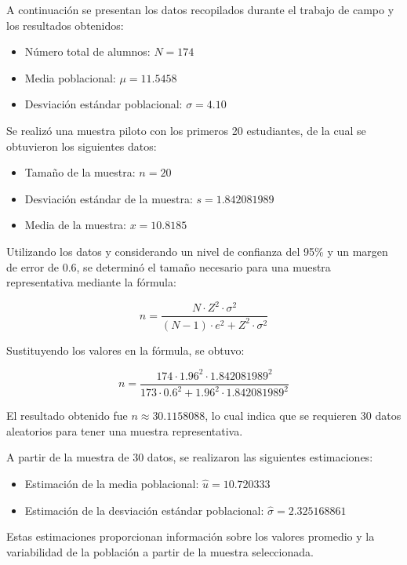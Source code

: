 \documentclass[
  a4paper,
]{article}
\providecommand{\tightlist}{%
  \setlength{\itemsep}{0pt}\setlength{\parskip}{0pt}}\usepackage{longtable,booktabs,array}
\begin{document}
A continuación se presentan los datos recopilados durante el trabajo de
campo y los resultados obtenidos:

\begin{itemize}
\tightlist
\item
  Número total de alumnos: \(N = 174\)
\item
  Media poblacional: \(\mu = 11.5458\)
\item
  Desviación estándar poblacional: \(\sigma = 4.10\)
\end{itemize}

Se realizó una muestra piloto con los primeros 20 estudiantes, de la
cual se obtuvieron los siguientes datos:

\begin{itemize}
\tightlist
\item
  Tamaño de la muestra: \(n = 20\)
\item
  Desviación estándar de la muestra: \(s = 1.842081989\)
\item
  Media de la muestra: \(x = 10.8185\)
\end{itemize}

Utilizando los datos y considerando un nivel de confianza del 95\% y un
margen de error de 0.6, se determinó el tamaño necesario para una
muestra representativa mediante la fórmula:

\[
n = \frac{{N \cdot Z^2 \cdot \sigma^2}}{{(N-1) \cdot e^2 + Z^2 \cdot \sigma^2}}
\]

Sustituyendo los valores en la fórmula, se obtuvo:

\[
n = \frac{{174 \cdot 1.96^2 \cdot 1.842081989^2}}{{173 \cdot 0.6^2 + 1.96^2 \cdot 1.842081989^2}}
\]

El resultado obtenido fue \(n \approx 30.1158088\), lo cual indica que
se requieren 30 datos aleatorios para tener una muestra representativa.

A partir de la muestra de 30 datos, se realizaron las siguientes
estimaciones:

\begin{itemize}
\tightlist
\item
  Estimación de la media poblacional: \(\hat{u} = 10.720333\)
\item
  Estimación de la desviación estándar poblacional:
  \(\hat{\sigma} = 2.325168861\)
\end{itemize}

Estas estimaciones proporcionan información sobre los valores promedio y
la variabilidad de la población a partir de la muestra seleccionada.


\printbibliography
\end{document}
